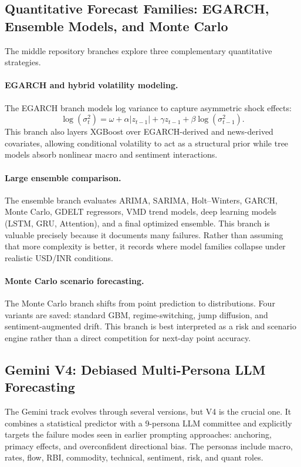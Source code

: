 \documentclass[11pt,a4paper]{article}
\begin{document}
\subsection{Quantitative Forecast Families: EGARCH, Ensemble Models, and Monte Carlo}

The middle repository branches explore three complementary quantitative strategies.

\paragraph{EGARCH and hybrid volatility modeling.}
The EGARCH branch models log variance to capture asymmetric shock effects:
\begin{equation}
\log(\sigma_t^2) = \omega + \alpha |z_{t-1}| + \gamma z_{t-1} + \beta \log(\sigma_{t-1}^2).
\end{equation}
This branch also layers XGBoost over EGARCH-derived and news-derived covariates, allowing conditional volatility to act as a structural prior while tree models absorb nonlinear macro and sentiment interactions.

\paragraph{Large ensemble comparison.}
The ensemble branch evaluates ARIMA, SARIMA, Holt--Winters, GARCH, Monte Carlo, GDELT regressors, VMD trend models, deep learning models (LSTM, GRU, Attention), and a final optimized ensemble. This branch is valuable precisely because it documents many failures. Rather than assuming that more complexity is better, it records where model families collapse under realistic USD/INR conditions.

\paragraph{Monte Carlo scenario forecasting.}
The Monte Carlo branch shifts from point prediction to distributions. Four variants are saved: standard GBM, regime-switching, jump diffusion, and sentiment-augmented drift. This branch is best interpreted as a risk and scenario engine rather than a direct competition for next-day point accuracy.

\subsection{Gemini V4: Debiased Multi-Persona LLM Forecasting}

The Gemini track evolves through several versions, but V4 is the crucial one. It combines a statistical predictor with a 9-persona LLM committee and explicitly targets the failure modes seen in earlier prompting approaches: anchoring, primacy effects, and overconfident directional bias. The personas include macro, rates, flow, RBI, commodity, technical, sentiment, risk, and quant roles.
\end{document}
